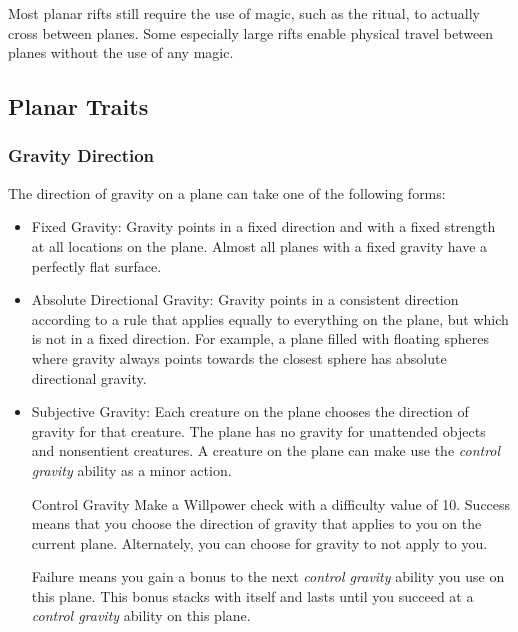         Most planar rifts still require the use of magic, such as the  ritual, to actually cross between planes.
        Some especially large rifts enable physical travel between planes without the use of any magic.

    \subsection{Planar Traits}
        \subsubsection{Gravity Direction}
            The direction of gravity on a plane can take one of the following forms:
            \begin{itemize}
                \item Fixed Gravity: Gravity points in a fixed direction and with a fixed strength at all locations on the plane.
                    Almost all planes with a fixed gravity have a perfectly flat surface.
                \item Absolute Directional Gravity: Gravity points in a consistent direction according to a rule that applies equally to everything on the plane, but which is not in a fixed direction.
                    For example, a plane filled with floating spheres where gravity always points towards the closest sphere has absolute directional gravity.
                \item Subjective Gravity: Each creature on the plane chooses the direction of gravity for that creature.
                    The plane has no gravity for unattended objects and nonsentient creatures.
                    A creature on the plane can make use the \textit{control gravity} ability as a minor action.
                    \begin{activeability}{Control Gravity}
                        \rankline
                        Make a Willpower check with a difficulty value of 10.
                        Success means that you choose the direction of gravity that applies to you on the current plane.
                        Alternately, you can choose for gravity to not apply to you.

                        Failure means you gain a  bonus to the next \textit{control gravity} ability you use on this plane.
                        This bonus stacks with itself and lasts until you succeed at a \textit{control gravity} ability on this plane.
                    \end{activeability}
            \end{itemize}

